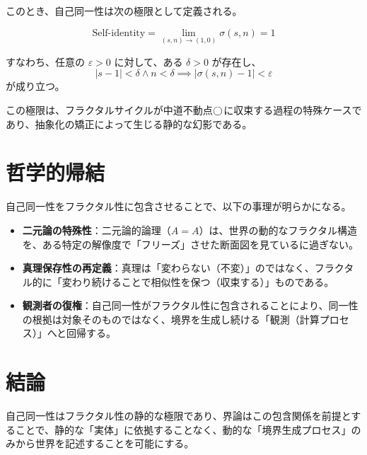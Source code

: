 \documentclass[11pt,a4paper]{ltjsarticle}
\begin{document}
このとき、自己同一性は次の極限として定義される。

\[
\text{Self-identity} = \lim_{(s, n) \to (1, 0)} \sigma(s, n) = 1
\]

すなわち、任意の $\varepsilon > 0$ に対して、ある $\delta > 0$ が存在し、
\[
|s - 1| < \delta \land n < \delta \implies |\sigma(s, n) - 1| < \varepsilon
\]
が成り立つ。

この極限は、フラクタルサイクルが中道不動点$\bigcirc$に収束する過程の特殊ケースであり、抽象化の矯正によって生じる静的な幻影である。

\section{哲学的帰結}
自己同一性をフラクタル性に包含させることで、以下の事理が明らかになる。

\begin{itemize}
    \item \textbf{二元論の特殊性}：二元論的論理（$A=A$）は、世界の動的なフラクタル構造を、ある特定の解像度で「フリーズ」させた断面図を見ているに過ぎない。
    \item \textbf{真理保存性の再定義}：真理は「変わらない（不変）」のではなく、フラクタル的に「変わり続けることで相似性を保つ（収束する）」ものである。
    \item \textbf{観測者の復権}：自己同一性がフラクタル性に包含されることにより、同一性の根拠は対象そのものではなく、境界を生成し続ける「観測（計算プロセス）」へと回帰する。
\end{itemize}

\section{結論}
自己同一性はフラクタル性の静的な極限であり、界論はこの包含関係を前提とすることで、静的な「実体」に依拠することなく、動的な「境界生成プロセス」のみから世界を記述することを可能にする。
\end{document}
